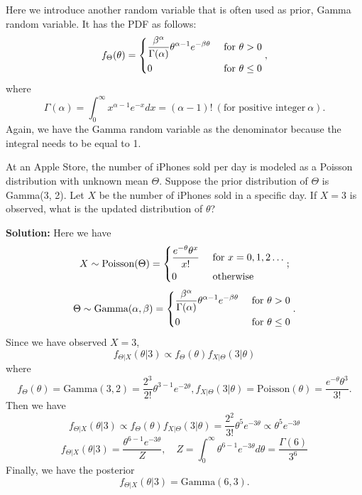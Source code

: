 Here we introduce another random variable that is often used as prior, Gamma random variable. It has the PDF as follows: 
\[
  f_{\Theta} (\theta) = \begin{dcases}
    \dfrac{\beta^{\alpha}}{\Gamma (\alpha)}\theta^{\alpha - 1} e^{-\beta\theta} &\text{ for } \theta > 0 \\
    0 &\text{ for } \theta \leq 0 \\
  \end{dcases}, 
\]
where 
\[
  \Gamma (\alpha) = \int_{0}^{\infty} x^{\alpha - 1} e^{-x} dx = (\alpha - 1)!\ (\text{for positive integer}\ \alpha).
\]
Again, we have the Gamma random variable as the denominator because the integral needs to be equal to 1.

\begin{eg}
  At an Apple Store, the number of iPhones sold per day is modeled as a Poisson distribution with unknown mean \(\Theta\). Suppose the prior distribution of \(\Theta\) is Gamma(3, 2). Let \(X\) be the number of iPhones sold in a specific day. If \(X = 3\) is observed, what is the updated distribution of \(\theta\)? 
  
  \textbf{Solution:} 
  Here we have 
  \[
    X \sim \text{Poisson}(\Theta) = \begin{dcases}
      \dfrac{e^{-\theta}\theta^x}{x!} &\text{ for } x = 0, 1, 2 \dots\\
      0  &\text{ otherwise} \\ 
    \end{dcases};
  \]
  \[
    \Theta \sim \text{Gamma}(\alpha, \beta) = \begin{dcases}
      \dfrac{\beta^{\alpha}}{\Gamma (\alpha)}\theta^{\alpha - 1} e^{-\beta\theta} &\text{ for } \theta > 0 \\
      0 &\text{ for } \theta \leq 0 \\
    \end{dcases}.
  \]
  Since we have observed \(X = 3\), 
  \[
    f_{\Theta \vert X} (\theta \vert 3) \propto f_{\Theta} (\theta) f_{X \vert \Theta} (3 \vert \theta)
  \]
  where
  \[
    f_{\Theta} (\theta) = \text{Gamma}(3, 2) = \dfrac{2^3}{2!}\theta^{3-1}e^{-2\theta}, f_{X \vert \Theta} (3 \vert \theta) = \text{Poisson}(\theta) = \dfrac{e^{-\theta}\theta^3}{3!}.
  \]
  Then we have
  \[
    f_{\Theta \vert X} (\theta \vert 3) \propto f_{\Theta} (\theta) f_{X \vert \Theta} (3 \vert \theta) = \dfrac{2^2}{3!} \theta^5 e^{-3\theta} \propto \theta^5 e^{-3\theta}
  \]
  \[
    f_{\Theta \vert X} (\theta \vert 3) = \dfrac{\theta^{6-1} e^{-3\theta}}{Z},\quad Z = \int_{0}^{\infty} \theta^{6-1} e^{-3\theta} d \theta = \dfrac{\Gamma(6)}{3^6}
  \]
  Finally, we have the posterior
  \[
    f_{\Theta \vert X} (\theta \vert 3) = \text{Gamma}(6, 3). 
  \]
\end{eg}

